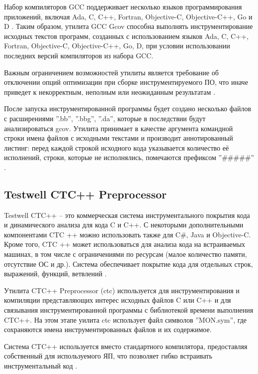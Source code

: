 Набор компиляторов GCC поддерживает несколько языков программирования приложений, включая Ada, C, C++, Fortran, Objective-C, Objective-C++, Go и D \cite{reviewGCC}. Таким образом, утилита GCC Gcov способна выполнять инструментирование исходных текстов программ, созданных с использованием языков Ada, C, C++, Fortran, Objective-C, Objective-C++, Go, D, при условии использовании последних версий компиляторов из набора GCC.

Важным ограничением возможностей утилиты является требование об отключении опций оптимизации при сборке инструментируемого ПО, что иначе приведет к некорректным, неполным или неожиданным результатам \cite{reviewGCCGcov}.

После запуска инструментированной программы будет создано несколько файлов с расширениями ''.bb'', ''.bbg'', ''.da'', которые в последствии будут анализироваться gcov. Утилита принимает в качестве аргумента командной строки имена файлов с исходными текстами и производит аннотированный листинг: перед каждой строкой исходного кода указывается количество её исполнений, строки, которые не исполнялись, помечаются префиксом ''\#\#\#\#\#'' \cite{reviewGCCGcov}.

\subsection{Testwell CTC++ Preprocessor}
Testwell CTC++ -- это коммерческая система инструментального покрытия кода и динамического анализа для кода C и C++. С некоторыми дополнительными компонентами CTC ++ можно использовать также для C\#, Java и Objective-C. Кроме того, CTC ++ может использоваться для анализа кода на встраиваемых машинах, в том числе с ограничениями по ресурсам (малое количество памяти, отсутствие ОС и др.). Система обеспечивает покрытие кода для отдельных строк, выражений, функций, ветвлений \cite{reviewCTC}.

Утилита CTC++ Preprocessor (ctc) используется для инструментирования и компиляции представляющих интерес исходных файлов C или C++ и для связывания инструментированной программы с библиотекой времени выполнения CTC++. На этом этапе уилита ctc использует файл символов ''MON.sym'', где сохраняются имена инструментированных файлов и их содержимое.

Система CTC++ используется вместо стандартного компилятора, предоставляя собственный для используемого ЯП, что позволяет гибко встраивать инструментальный код \cite{reviewCTC}.

